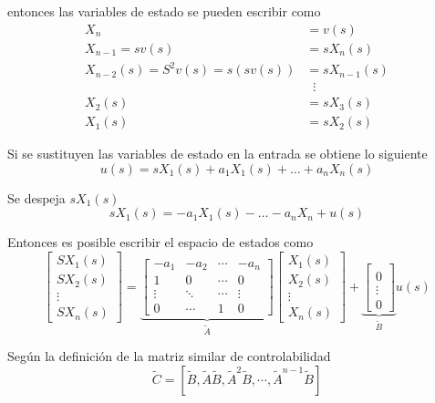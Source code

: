 entonces las variables de estado se pueden escribir como
\[
    \begin{split}
        X_{n} & = v(s) \\
        X_{n-1} = sv(s) & = sX_{n}(s) \\
        X_{n-2}(s) = S^{2}v(s) =s(sv(s)) & = sX_{n-1}(s) \\
        &\;\;\vdots \\
        X_{2}(s) & = sX_{3}(s) \\
        X_{1}(s) & = sX_{2}(s)
    \end{split}
\]

Si se sustituyen las variables de estado en la entrada se obtiene lo siguiente
\[
    u(s) = sX_{1}(s) + a_{1}X_{1}(s) + \ldots + a_{n}X_{n}(s)
\]

Se despeja \( sX_{1}(s) \)
\[
    sX_{1}(s) = -a_{1}X_{1}(s) - \ldots - a_{n}X_{n} + u(s)
\]

Entonces es posible escribir el espacio de estados como
\[
    \begin{bmatrix}
        SX_{1}(s) \\
        SX_{2}(s) \\
        \vdots \\
        SX_{n}(s)
    \end{bmatrix}
    =
    \underbrace{
        \begin{bmatrix}
        -a_{1} & -a_{2} & \cdots & -a_{n} \\
        1 & 0 & \cdots & 0 \\
        \vdots & \ddots & \cdots & \vdots \\
        0 & \cdots & 1 & 0
        \end{bmatrix}
                }_{\tilde{A}}
    \begin{bmatrix}
        X_{1}(s) \\
        X_{2}(s) \\
        \vdots \\
        X_{n}(s)
    \end{bmatrix}
    +
    \underbrace{
        \begin{bmatrix}
            \\ 0 \\ \vdots \\ 0
        \end{bmatrix}
                }_{\tilde{B}}
     u(s)
\]

Según la definición de la matriz similar de controlabilidad
\[
    \tilde{C} = [
    \tilde{B},
    \tilde{A}\tilde{B},
    \tilde{A}^{2}\tilde{B},
    \cdots,
    \tilde{A}^{n-1}\tilde{B} ]
\]

